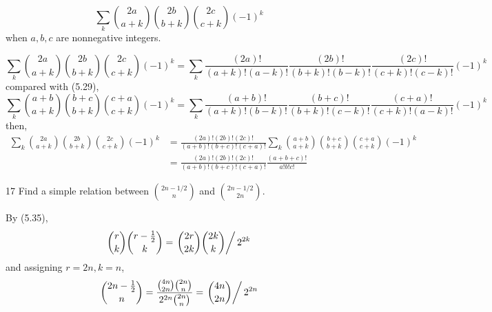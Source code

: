 \documentclass[a4paper,12pt]{article}
\makeatletter
\newtheorem*{solution}{Solution}
\theoremstyle{definition}
\renewenvironment{solution}[1][Solution] {\par\pushQED{\qed}\normalfont\topsep6\p@\@plus6\p@\relax\trivlist\item[\hskip\labelsep\bfseries#1\@addpunct{.}]\ignorespaces}{\popQED\endtrivlist\@endpefalse} \makeatother
\newenvironment{problems}{\begin{list}{}{\renewcommand{\makelabel}[1]{\textbf{##1}\hfil}}}{\end{list}}
\makeatother
\begin{document}
\begin{problems}
   \begin{equation*}
       \sum_k\binom{2a}{a+k}\binom{2b}{b+k}\binom{2c}{c+k}(-1)^k
   \end{equation*}
   when $a, b, c$ are nonnegative integers.
   \begin{solution}
       \begin{equation*}
        \sum_k\binom{2a}{a+k}\binom{2b}{b+k}\binom{2c}{c+k}(-1)^k 
        = \sum_k \frac{(2a)!}{(a+k)!(a-k)!}\frac{(2b)!}{(b+k)!(b-k)!}\frac{(2c)!}{(c+k)!(c-k)!}(-1)^k
       \end{equation*}
       compared with (5.29),
       \begin{equation*}
        \sum_k\binom{a+b}{a+k}\binom{b+c}{b+k}\binom{c+a}{c+k}(-1)^k
        = \sum_k \frac{(a+b)!}{(a+k)!(b-k)!}\frac{(b+c)!}{(b+k)!(c-k)!}\frac{(c+a)!}{(c+k)!(a-k)!}(-1)^k
       \end{equation*}
       then,
       \begin{align*}
        \sum_k\binom{2a}{a+k}\binom{2b}{b+k}\binom{2c}{c+k}(-1)^k &= \frac{(2a)!(2b)!(2c)!}{(a+b)!(b+c)!(c+a)!}\sum_k\binom{a+b}{a+k}\binom{b+c}{b+k}\binom{c+a}{c+k}(-1)^k\\
        &= \frac{(2a)!(2b)!(2c)!}{(a+b)!(b+c)!(c+a)!} \frac{(a+b+c)!}{a!b!c!}
       \end{align*}
   \end{solution}
   \item[17]Find a simple relation between $\binom{2n-1/2}{n}$ and $\binom{2n-1/2}{2n}$.
   \begin{solution}
       By (5.35),
       \begin{equation*}
           \binom{r}{k}\binom{r-\frac{1}{2}}{k} = \left.\binom{2r}{2k}\binom{2k}{k}\right\slash 2^{2k}
       \end{equation*}
       and assigning $r=2n,k=n$,
       \begin{equation*}
           \binom{2n-\frac{1}{2}}{n} = \frac{\binom{4n}{2n}\binom{2n}{n}}{2^{2n}\binom{2n}{n}} = \left.\binom{4n}{2n}\right\slash 2^{2n}
       \end{equation*}

\end{solution}
\end{problems}
\end{document}
